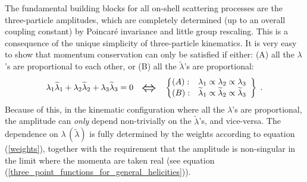 \documentclass[12pt,hyperref,compress]{JHEP3}
\newcommand{\eq}[1]{\begin{equation}#1\end{equation}}
\begin{document}
The fundamental building blocks for all on-shell scattering processes are the three-particle amplitudes, which are completely determined (up to an overall coupling constant) by Poincar\'{e} invariance and little group rescaling. This is a consequence of the unique simplicity of three-particle kinematics. It is very easy to show that momentum conservation can only be satisfied if either: (A) all the $\lambda$'s are proportional to each other, or (B) all the $\widetilde \lambda$'s are proportional:
\vspace{-.4cm}\eq{\lambda_1 \widetilde \lambda_1 + \lambda_2 \widetilde \lambda_2 + \lambda_3 \widetilde \lambda_3 = 0\quad\raisebox{-2.2pt}{\text{{\LARGE$\Leftrightarrow$}}}\quad{\rm }\left\{\begin{array}{@{}l@{$\quad$}c}(A):& \lambda_1 \propto \lambda_2 \propto \lambda_3\\ (B):&\widetilde \lambda_1 \propto \widetilde \lambda_2 \propto \widetilde \lambda_3\end{array}\right\}\;.\vspace{-.3cm}}
Because of this, in the kinematic configuration where all the $\lambda$'s are proportional, the amplitude can {\it only} depend non-trivially on the $\widetilde \lambda$'s, and vice-versa. The dependence on $\lambda\,(\widetilde \lambda)$ is fully determined by the weights according to equation (\ref{weights}), together with the requirement that the amplitude is non-singular in the limit where the momenta are taken real (see equation (\ref{three_point_functions_for_general_helicities})).
\end{document}
